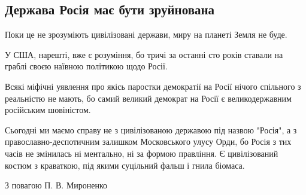  
 
 
 
 

\subsection{Держава Росія має бути зруйнована}
\label{sec:09_04_2021.fb.mironenko_petr.1.rossia}

Поки це не зрозуміють цивілізовані держави, миру на планеті Земля не буде.

У США, нарешті, вже є розуміння, бо тричі за останні сто років ставали на граблі своєю наївною політикою щодо Росії.

Всякі міфічні уявлення про якісь паростки демократії на Росії нічого спільного з реальністю не мають, бо самий великий демократ на Росії є великодержавним російським шовіністом.

Сьогодні ми маємо справу не з цивілізованою державою під назвою "Росія", а з
православно-деспотичним залишком Московського улусу Орди, бо Росія з тих часів
не змінилась ні ментально, ні за формою правління. Є цивілізований костюм з
краваткою, під якими суцільний фальш і гнила біомаса.

З повагою П. В. Мироненко

